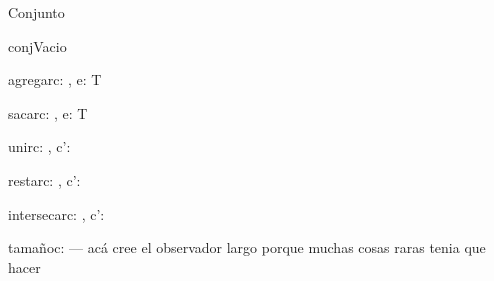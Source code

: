 \documentclass[10pt,a4paper]{article}
\begin{document}
\salto{\baselineskip}
\begin{tad}{Conjunto}
    \begin{proc}{conjVacio}{}{\nt}
    \end{proc}
    \begin{proc}{agregar}{\Inout c: \nt, \In e: T}{}
    \end{proc}
    \begin{proc}{sacar}{\Inout c: \nt, \In e: T}{}
    \end{proc} 
    \begin{proc}{unir}{\Inout c: \nt, \In c': \nt}{}
    \end{proc}
    \begin{proc}{restar}{\Inout c: \nt, \In c': \nt}{}
    \end{proc}
    \begin{proc}{intersecar}{\Inout c: \nt, \In c': \nt}{}
    \end{proc}
    \begin{proc}{tamaño}{\In c: \nt}{\nat}
        {\color{red} --- acá cree el observador largo porque muchas cosas raras tenia que hacer}
        \\
    \end{proc}
\end{tad}
\salto{\baselineskip}
\end{document}
